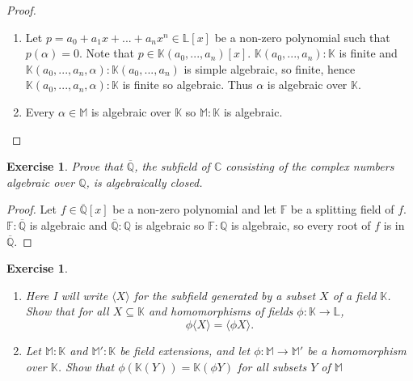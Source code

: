 \documentclass{article}
\newtheorem{exercise}[theorem]{Exercise}
\begin{document}
\begin{proof}
\begin{enumerate}[label=(\roman*)]
    \item Let $p=a_0+a_1x+...+a_nx^n\in\mathbb{L}[x]$ be a non-zero polynomial such that $p(\alpha)=0$. Note that $p\in \mathbb{K}(a_0,...,a_n)[x]$. $\mathbb{K}(a_0,...,a_n):\mathbb{K}$ is finite and $\mathbb{K}(a_0,...,a_n,\alpha):\mathbb{K}(a_0,...,a_n)$ is simple algebraic, so finite, hence $\mathbb{K}(a_0,...,a_n,\alpha):\mathbb{K}$ is finite so algebraic. Thus $\alpha$ is algebraic over $\mathbb{K}$.
    \item Every $\alpha\in \mathbb{M}$ is algebraic over $\mathbb{K}$ so $\mathbb{M}:\mathbb{K}$ is algebraic.
\end{enumerate}
\end{proof}

\begin{exercise}
Prove that $\overline{\mathbb{Q}}$, the subfield of $\mathbb{C}$ consisting of the complex numbers algebraic over $\mathbb{Q}$, is algebraically closed.
\end{exercise}
\begin{proof}
Let $f\in \overline{\mathbb{Q}}[x]$ be a non-zero polynomial and let $\mathbb{F}$ be a splitting field of $f$. $\mathbb{F}:\overline{\mathbb{Q}}$ is algebraic and $\overline{\mathbb{Q}}:\mathbb{Q}$ is algebraic so $\mathbb{F}:\mathbb{Q}$ is algebraic, so every root of $f$ is in $\overline{\mathbb{Q}}$.
\end{proof}

\begin{exercise}
\begin{enumerate}[label=(\roman*)]
    \item Here I will write $\langle X\rangle$ for the subfield generated by a subset $X$ of a field $\mathbb{K}$. Show that for all $X\subseteq\mathbb{K}$ and homomorphisms of fields $\phi:\mathbb{K}\to\mathbb{L}$,\[\phi\langle X\rangle=\langle\phi X\rangle.\]
    \item Let $\mathbb{M}:\mathbb{K}$ and $\mathbb{M}':\mathbb{K}$ be field extensions, and let $\phi:\mathbb{M}\to\mathbb{M}'$ be a homomorphism over $\mathbb{K}$. Show that $\phi(\mathbb{K}(Y))=\mathbb{K}(\phi Y)$ for all subsets $Y$ of $\mathbb{M}$
\end{enumerate}
\end{exercise}
\end{document}
